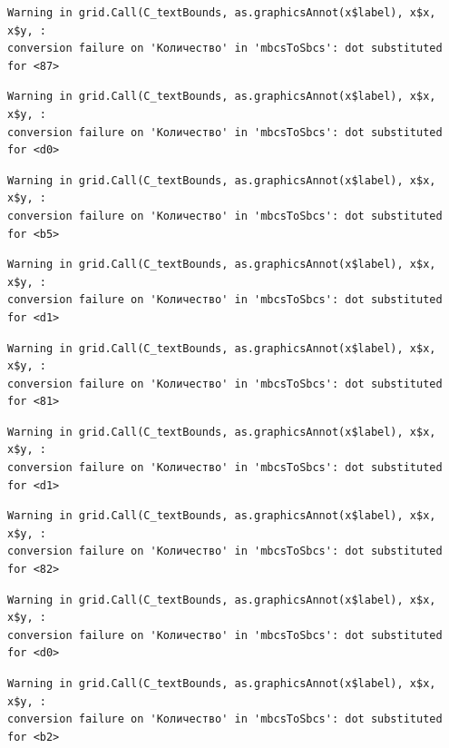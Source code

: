 \documentclass[
  letterpaper,
  DIV=11,
  numbers=noendperiod]{scrreprt}
\theoremstyle{definition}
\theoremstyle{remark}
\begin{document}
\begin{verbatim}
Warning in grid.Call(C_textBounds, as.graphicsAnnot(x$label), x$x, x$y, :
conversion failure on 'Количество' in 'mbcsToSbcs': dot substituted for <87>
\end{verbatim}

\begin{verbatim}
Warning in grid.Call(C_textBounds, as.graphicsAnnot(x$label), x$x, x$y, :
conversion failure on 'Количество' in 'mbcsToSbcs': dot substituted for <d0>
\end{verbatim}

\begin{verbatim}
Warning in grid.Call(C_textBounds, as.graphicsAnnot(x$label), x$x, x$y, :
conversion failure on 'Количество' in 'mbcsToSbcs': dot substituted for <b5>
\end{verbatim}

\begin{verbatim}
Warning in grid.Call(C_textBounds, as.graphicsAnnot(x$label), x$x, x$y, :
conversion failure on 'Количество' in 'mbcsToSbcs': dot substituted for <d1>
\end{verbatim}

\begin{verbatim}
Warning in grid.Call(C_textBounds, as.graphicsAnnot(x$label), x$x, x$y, :
conversion failure on 'Количество' in 'mbcsToSbcs': dot substituted for <81>
\end{verbatim}

\begin{verbatim}
Warning in grid.Call(C_textBounds, as.graphicsAnnot(x$label), x$x, x$y, :
conversion failure on 'Количество' in 'mbcsToSbcs': dot substituted for <d1>
\end{verbatim}

\begin{verbatim}
Warning in grid.Call(C_textBounds, as.graphicsAnnot(x$label), x$x, x$y, :
conversion failure on 'Количество' in 'mbcsToSbcs': dot substituted for <82>
\end{verbatim}

\begin{verbatim}
Warning in grid.Call(C_textBounds, as.graphicsAnnot(x$label), x$x, x$y, :
conversion failure on 'Количество' in 'mbcsToSbcs': dot substituted for <d0>
\end{verbatim}

\begin{verbatim}
Warning in grid.Call(C_textBounds, as.graphicsAnnot(x$label), x$x, x$y, :
conversion failure on 'Количество' in 'mbcsToSbcs': dot substituted for <b2>
\end{verbatim}
\end{document}
